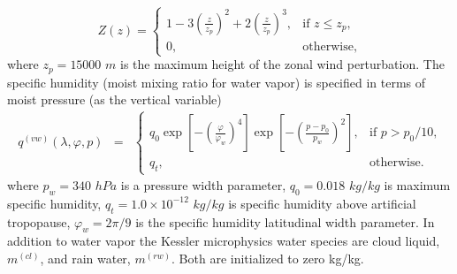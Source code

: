 \documentclass{agujournal}
\begin{document}
\begin{equation}
Z(z) = \left\{ \begin{array}{ll} \displaystyle 1 - 3 \left( \frac{z}{z_p} \right)^2 + 2 \left( \frac{z}{z_p} \right)^3, & \mbox{if $z \leq z_p$,} \\ 0, & \mbox{otherwise,} \end{array} \right.
\end{equation}
where $z_p=15000$ $m$ is the maximum height of the zonal wind perturbation. The specific humidity (moist mixing ratio for water vapor) is specified in terms of moist pressure (as the vertical variable)
\begin{eqnarray}
q^{(vw)}(\lambda, \varphi, p) &=& \left\{ \begin{array}{ll} q_0 \exp\left[- \left(\frac{\varphi}{\varphi_{w}}\right)^4 \right] \exp\left[- \left(\frac{p-p_0}{p_{w}}\right)^2  \right], & \mbox{if $p > p_0 / 10$,} \\ q_{t}, & \mbox{otherwise.} \end{array} \right.
\end{eqnarray} 
where $p_w=340$ $hPa$ is a pressure width parameter, $q_0=0.018$ $kg/kg$ is maximum specific humidity, $q_t=1.0\times 10^{-12}$ $kg/kg$ is specific humidity above artificial tropopause, $\varphi_{w}=2\pi/9$ is the specific humidity latitudinal width parameter. In addition to water vapor the Kessler microphysics water species are cloud liquid, $m^{(cl)}$, and rain water, $m^{(rw)}$. Both are initialized to zero kg/kg.


%
%

%
\end{document}
